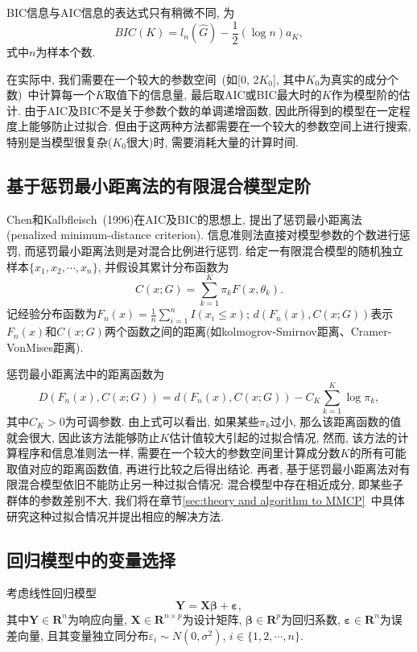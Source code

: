 \documentclass[a4paper,12pt,openany,oneside,utf-8]{ctexbook}
\begin{document}
BIC信息与AIC信息的表达式只有稍微不同, 为
\begin{equation*}
  BIC(K)=l_{n}(\hat{G})-\frac{1}{2}(\log{n})a_K,
\end{equation*}
式中$n$为样本个数. 
 
在实际中, 我们需要在一个较大的参数空间~(如[0, 2$K_0$], 其中$K_0$为真实的成分个数)~中计算每一个$K$取值下的信息量, 最后取AIC或BIC最大时的$K$作为模型阶的估计. 由于AIC及BIC不是关于参数个数的单调递增函数, 因此所得到的模型在一定程度上能够防止过拟合. 但由于这两种方法都需要在一个较大的参数空间上进行搜索, 特别是当模型很复杂($K_0$很大)时, 需要消耗大量的计算时间.

\subsection{基于惩罚最小距离法的有限混合模型定阶}
Chen和Kalbfleisch~(1996)在AIC及BIC的思想上, 提出了惩罚最小距离法(penalized minimum-distance criterion). 信息准则法直接对模型参数的个数进行惩罚, 而惩罚最小距离法则是对混合比例进行惩罚. 给定一有限混合模型的随机独立样本$\{x_1, x_2, \cdots, x_n\}$, 并假设其累计分布函数为
\begin{equation*}
  C(x; G)=\sum_{k=1}^{K}\pi_{k}F(x, \theta_{k}).
\end{equation*}
记经验分布函数为$F_{n}(x)=\frac{1}{n}\sum_{i=1}^{n}I(x_{i} \leq x)$; $d(F_{n}(x), C(x; G))$表示$F_{n}(x)$和$C(x; G)$两个函数之间的距离(如kolmogrov-Smirnov距离、Cramer-VonMises距离).

惩罚最小距离法中的距离函数为
\begin{equation}
\label{equ:penalized distance in penalized minimum-distance criterion}
  D(F_{n}(x), C(x; G))=d(F_{n}(x), C(x; G))-C_{K}\sum_{k=1}^{K}\log\pi_{k},
\end{equation}
其中$C_{K}>0$为可调参数. 由上式可以看出, 如果某些$\pi_{k}$过小, 那么该距离函数的值就会很大, 因此该方法能够防止$K$估计值较大引起的过拟合情况, 然而, 该方法的计算程序和信息准则法一样, 需要在一个较大的参数空间里计算成分数$K$的所有可能取值对应的距离函数值, 再进行比较之后得出结论. 再者, 基于惩罚最小距离法对有限混合模型依旧不能防止另一种过拟合情况: 混合模型中存在相近成分, 即某些子群体的参数差别不大, 我们将在章节\ref{sec:theory and algorithm to MMCP}~中具体研究这种过拟合情况并提出相应的解决方法.

\subsection{回归模型中的变量选择}
考虑线性回归模型
\begin{equation}
\label{equ:linear regression model}
  \bm{Y}=\bm{X}\bm{\beta}+\bm{\varepsilon},
\end{equation}
其中$\bm{Y} \in \bm{R}^{n}$为响应向量, $\bm{X} \in \bm{R}^{n \times p}$为设计矩阵, $\bm{\beta} \in \bm{R}^{p}$为回归系数, $\bm{\varepsilon} \in \bm{R}^{n}$为误差向量, 且其变量独立同分布$\varepsilon_i \sim N(0, \sigma^2)$, $i \in \{1, 2, \cdots, n\}$.
\end{document}
